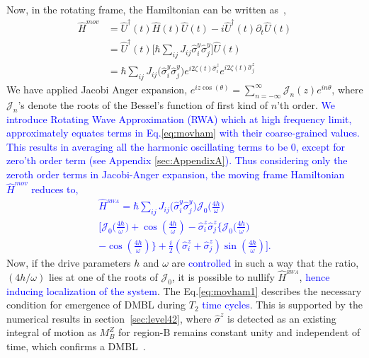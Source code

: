 \documentclass[%
nofootinbib,
reprint,
superscriptaddress,
amsmath,amssymb,showkeys,
aps,
prb,
]{revtex4-2}
\newcommand{\blue}[1]{\textcolor{blue}{#1}}
\begin{document}
	Now, in the rotating frame, the Hamiltonian can be written as~\cite{haldar_dynamical_2021},
	\begin{align}
		\hat{H}^{mov} &= \hat{U}^\dagger(t) \hat{H}(t) \hat{U}(t)- i \hat{U}^\dagger(t) \partial_t \hat{U}(t)\nonumber\\
		&= \hat{U}^\dagger(t) \big[\hbar\sum_{ij}J_{ij}\hat{\sigma}^y_i\hat{\sigma}^y_j\big] \hat{U}(t)\nonumber\\
		&=\hbar\sum_{ij} J_{ij} \Big(\hat{\sigma}^y_i\hat{\sigma}^y_j\Big) e^{i 2\zeta(t) \hat{\sigma}^z_i}  e^{i 2\zeta(t) \hat{\sigma}^z_j}
		\label{eq:movham}
	\end{align}
	We have applied Jacobi Anger expansion, $\displaystyle e^{iz \cos(\theta)} = \sum_{n=-\infty}^{\infty} \mathcal{J}_n(z) e^{in\theta}$, where $\mathcal{J}_n$'s denote the roots of the Bessel's function of first kind of $n$'th order. \blue{We introduce Rotating Wave Approximation (RWA) which at high frequency limit, approximately equates terms in Eq.\eqref{eq:movham} with their coarse-grained values. This results in averaging all the harmonic oscillating terms to be 0, except for zero'th order term (see Appendix \ref{sec:AppendixA}). Thus considering only the zeroth order terms in Jacobi-Anger expansion, the moving frame Hamiltonian $\hat{H}^{mov}$ reduces to,
		\begin{multline}
			\hat{H}^{_{RWA}} = \hbar\sum_{ij} J_{ij} \Big(\hat{\sigma}^y_i\hat{\sigma}^y_j\Big) \mathcal{J}_0\Big(\frac{4h}{\omega}\Big)\\
			\Bigg[\mathcal{J}_0\Big(\frac{4h}{\omega}\Big) + \cos(\frac{4h}{\omega})-\hat{\sigma}^z_i\hat{\sigma}^z_j \bigg\{\mathcal{J}_0\Big(\frac{4h}{\omega}\Big)\\
			- \cos(\frac{4h}{\omega})\bigg\} + \frac{i}{2} (\hat{\sigma}^z_i + \hat{\sigma}^z_j) \sin(\frac{4h}{\omega})\Bigg].
			\label{eq:movham1}
	\end{multline}}
	Now, if the drive parameters $h$ and $\omega$  are \blue{controlled} in such a way that the ratio, $({4h}/{\omega})$ lies at one of the roots of $\mathcal{J}_0$, it is possible to nullify $\hat{H}^{_{RWA}}$, \blue{hence inducing localization of the system}. The Eq.\eqref{eq:movham1} describes the necessary condition for emergence of DMBL during $T_2$ \blue{time cycles}. This is supported by the numerical results in section~\ref{sec:level42}, where $\hat{\sigma}^z$ is detected as an existing integral of motion as $M^Z_B$ for region-B remains constant unity and independent of time, which confirms a DMBL~\cite{Keser2016,Dodonov1978}. 
	
\end{document}
